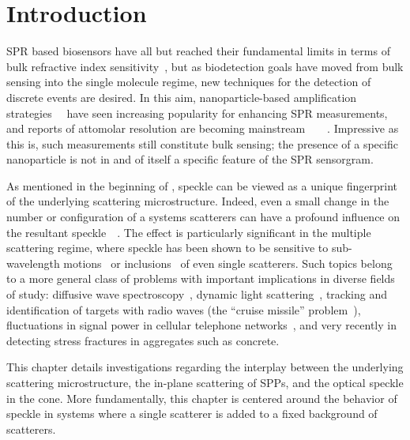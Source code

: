 \section{Introduction}
SPR based biosensors have all but reached their fundamental limits in terms of
bulk refractive index sensitivity~\cite{piliarik2009surface}, but as
biodetection goals have moved from bulk sensing into the single molecule
regime, new techniques for the detection of discrete events are desired.  In
this aim, nanoparticle-based amplification
strategies~\cite{wang2005nanomaterial}~\cite{jain2007review} have seen
increasing popularity for enhancing SPR measurements, and reports of attomolar
resolution are becoming
mainstream~\cite{fang2006attomole}~\cite{krishnan2011attomolar}~\cite{kwon2012nanoparticle}~\cite{sim2010attomolar}.
Impressive as this is, such measurements still constitute bulk sensing; the
presence of a specific nanoparticle is not in and of itself a specific feature
of the SPR sensorgram.

As mentioned in the beginning of , speckle can be viewed as
a unique fingerprint~\cite{ravikanth2001physical} of the underlying scattering
microstructure.  Indeed, even a small change in the number or configuration of
a systems scatterers can have a profound influence on the resultant
speckle~\cite{berkovits1994correlations}~\cite{feng1986sensitivity}.  The
effect is particularly significant in the multiple scattering regime, where
speckle has been shown to be sensitive to sub-wavelength
motions~\cite{berkovits1991sensitivity} or
inclusions~\cite{berkovits1990theory} of even single scatterers.  Such topics
belong to a more general class of problems with important implications in
diverse fields of study: diffusive wave spectroscopy~\cite{pine1988diffusing},
dynamic light scattering~\cite{berne2000dynamic}, tracking and identification
of targets with radio waves (the ``cruise missile''
problem~\cite{atkins1991neural}), fluctuations in signal power in cellular
telephone networks~\cite{abdi2001estimation}, and very recently in detecting
stress fractures in aggregates such as concrete.

This chapter details investigations regarding the interplay between the
underlying scattering microstructure, the in-plane scattering of SPPs, and
the optical speckle in the cone.  More fundamentally, this chapter is
centered around the behavior of speckle in systems where a single scatterer
is added to a fixed background of scatterers.
